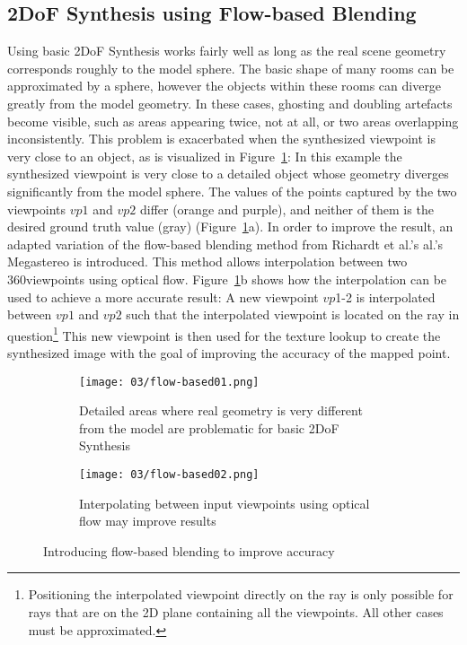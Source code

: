 \subsection{2DoF Synthesis using Flow-based Blending}
Using basic 2DoF Synthesis works fairly well as long as the real scene geometry corresponds roughly to the model sphere. The basic shape of many rooms can be approximated by a sphere, however the objects within these rooms can diverge greatly from the model geometry. In these cases, ghosting and doubling artefacts become visible, such as areas appearing twice, not at all, or two areas overlapping inconsistently. This problem is exacerbated when the synthesized viewpoint is very close to an object, as is visualized in Figure~\ref{fig:flow-based-mot}: In this example the synthesized viewpoint is very close to a detailed object whose geometry diverges significantly from the model sphere. The values of the points captured by the two viewpoints $vp1$ and $vp2$ differ (orange and purple), and neither of them is the desired ground truth value (gray) (Figure~\ref{fig:flow-based-mot}a). In order to improve the result, an adapted variation of the flow-based blending method from Richardt et al.'s al.'s Megastereo \cite{megastereo} is introduced. This method allows interpolation between two 360\degree viewpoints using optical flow. Figure~\ref{fig:flow-based-mot}b shows how the interpolation can be used to achieve a more accurate result: A new viewpoint $vp$1-2 is interpolated between $vp1$ and $vp2$ such that the interpolated viewpoint is located on the ray in question\footnote{Positioning the interpolated viewpoint directly on the ray is only possible for rays that are on the 2D plane containing all the viewpoints. All other cases must be approximated.} This new viewpoint is then used for the texture lookup to create the synthesized image with the goal of improving the accuracy of the mapped point.

\begin{figure}
\centering
    \hfill
    \begin{subfigure}[t]{0.4\textwidth}            
            \centering
            \texttt{[image: 03/flow-based01.png]}
            \caption{Detailed areas where real geometry is very different from the model are problematic for basic 2DoF Synthesis}
    \end{subfigure}%
    \hfill
    \begin{subfigure}[t]{0.4\textwidth}
            \centering
            \texttt{[image: 03/flow-based02.png]}
            \caption{Interpolating between input viewpoints using optical flow may improve results}
    \end{subfigure}
    \hfill
    \hfill
  \caption[Flow-based blending to improve accuracy in close, detailed areas]{Introducing flow-based blending to improve accuracy} \label{fig:flow-based-mot}
\end{figure}

